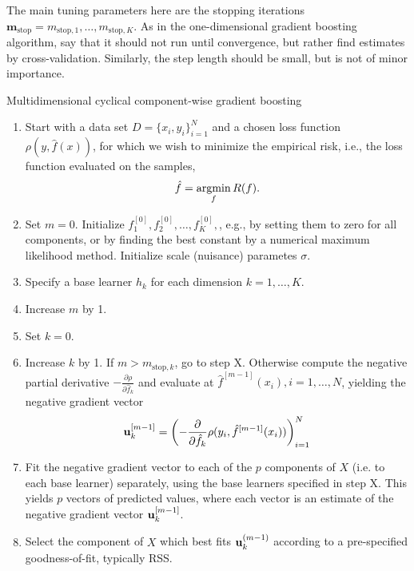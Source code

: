 The main tuning parameters here are the stopping iterations $\mathbf{m}_{\text{stop}}=m_{\text{stop},1},\ldots,m_{\text{stop},K}$. As in the one-dimensional gradient boosting algorithm, \citet{schmid} say that it should not run until convergence, but rather find estimates by cross-validation. Similarly, the step length should be small, but is not of minor importance.

\begin{algorithm}
\caption{Multidimensional cyclical component-wise gradient boosting}
\label{algo:multi-cyclical}
\begin{enumerate}
    \item Start with a data set $D=\{x_i, y_i\}_{i=1}^N$ and a chosen loss function $\rho(y,\hat{f}(x))$, for which we wish to
        minimize the empirical risk, i.e., the loss function evaluated on the samples,
        \begin{equation}
            \hat{f}=\operatorname*{argmin}_{f}R(f).
        \end{equation}
    \item Set $m=0$. Initialize $f^{[0]}_1,f^{[0]}_2,\ldots,f^{[0]}_K,$, e.g., by setting them to zero for all components, or by finding the best constant by a numerical maximum likelihood method. Initialize scale (nuisance) parametes $\sigma$.
    \item Specify a base learner $h_k$ for each dimension $k=1,\ldots,K$.
    \item Increase $m$ by 1.
    \item Set $k=0$.
    \item Increase $k$ by 1. If $m>m_{\text{stop},k}$, go to step X. Otherwise compute the negative partial derivative
        $-\frac{\partial\rho}{\partial \hat{f}_k}$ and evaluate at $\hat{f}^{[m-1]}(x_i),i=1,\ldots,N$, yielding the
        negative gradient vector
        \begin{equation}
            \mathbf{u}^{[m-1]}_k=\left(-\frac{\partial}{\partial \hat{f}_k}\rho(y_i, \hat{f}^{[m-1]}(x_i))\right)_{i=1}^N
        \end{equation}
    \item Fit the negative gradient vector to each of the $p$ components of $X$ (i.e. to each base learner) separately, using the base learners specified in step X. This yields $p$ vectors of predicted values, where each vector is an estimate of the negative gradient vector $\mathbf{u}^{[m-1]}_k$.
    \item Select the component of $X$ which best fits $\mathbf{u}^{(m-1)}_k$ according to a pre-specified goodness-of-fit, typically RSS.

\end{enumerate}
\end{algorithm}

